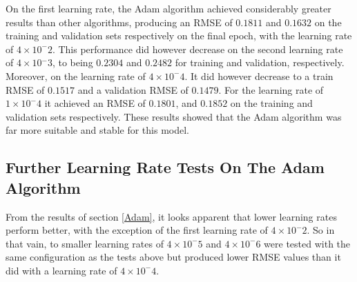 \documentclass[12pt,a4paper,oneside,oldfontcommands]{memoir}
\begin{document}
On the first learning rate, the Adam algorithm achieved considerably greater results than other algorithms, producing an RMSE of \(0.1811\) and \(0.1632\) on the training and validation sets respectively on the final epoch, with the learning rate of \(4\times{10^-2}\). This performance did however decrease on the second learning rate of \(4\times10{^-3}\), to being \(0.2304\) and \(0.2482\) for training and validation, respectively. Moreover, on the learning rate of \(4\times{10^-4}\). It did however decrease to a train RMSE of \(0.1517\) and a validation RMSE of \(0.1479\). For the learning rate of \(1\times{10^-4}\) it achieved an RMSE of \(0.1801\), and \(0.1852\) on the training and validation sets respectively. These results showed that the Adam algorithm was far more suitable and stable for this model. 

\subsection{Further Learning Rate Tests On The Adam Algorithm}

From the results of section \ref{Adam}, it looks apparent that lower learning rates perform better, with the exception of the first learning rate of \(4\times{10^-2}\). So in that vain, to smaller learning rates of \(4\times{10^-5}\) and \(4\times{10^-6}\) were tested with the same configuration as the tests above but produced lower RMSE values than it did with a learning rate of \(4\times{10^-4}\).
\end{document}
